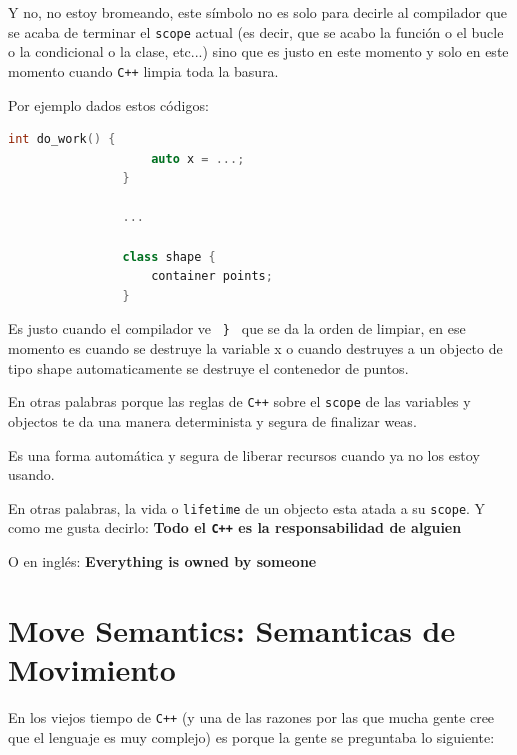 \documentclass[12pt, fleqn]{report}                             %
\theoremstyle{break}                                            %
\newcommand \Cpp  {\texttt{C++} }                               %
\begin{document}
            Y no, no estoy bromeando, este símbolo no es solo para decirle al compilador
            que se acaba de terminar el \texttt{scope} actual (es decir, que se acabo 
            la función o el bucle o la condicional o la clase, etc...) sino que es justo
            en este momento y solo en este momento cuando \Cpp limpia toda la basura.

            Por ejemplo dados estos códigos:
            \begin{lstlisting}[language=C++, gobble=10]
                int do_work() {
                    auto x = ...;
                }

                ...

                class shape {
                    container points;
                }
            \end{lstlisting}

            Es justo cuando el compilador ve \texttt{ \} } que se da la orden de limpiar,
            en ese momento es cuando se destruye la variable x o cuando destruyes a un objecto
            de tipo shape automaticamente se destruye el contenedor de puntos.
            
            En otras palabras porque las reglas de \Cpp sobre el \texttt{scope} de las variables
            y objectos te da una manera determinista y segura de finalizar weas.

            Es una forma automática y segura de liberar recursos cuando ya no los estoy usando.

            En otras palabras, la vida o \texttt{lifetime} de un objecto esta atada a su \texttt{scope}.
            Y como me gusta decirlo:
            \textbf{
                Todo el \Cpp es la responsabilidad de alguien
            }

            O en inglés:
            \textbf{
                Everything is owned by someone
            }

            \cite{ModernCppWhatYouNeedToKnow}

        \clearpage
        \section{Move Semantics: Semanticas de Movimiento}     
        
            En los viejos tiempo de \Cpp (y una de las razones por las que mucha gente cree que 
            el lenguaje es muy complejo) es porque la gente se preguntaba lo siguiente:
\end{document}
